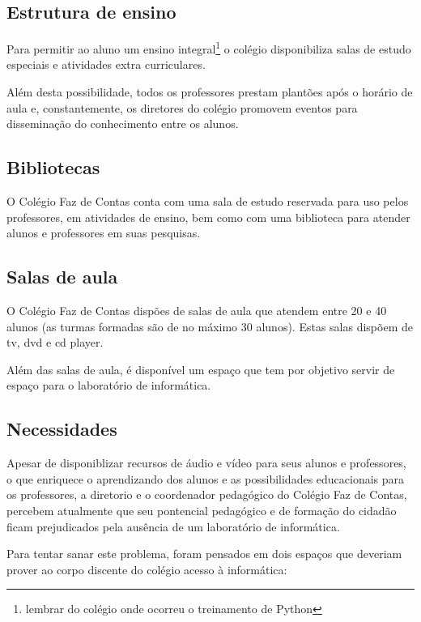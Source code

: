 \documentclass[a4paper,12pt]{report}
\begin{document}
            \subsection{Estrutura de ensino}
            Para permitir ao aluno um ensino integral\footnote{lembrar do
            colégio onde ocorreu o treinamento de Python} o colégio
            disponibiliza salas de estudo especiais e atividades extra
            curriculares.

            Além desta possibilidade, todos os professores prestam plantões
            após o horário de aula e, constantemente, os diretores do colégio
            promovem eventos para disseminação do conhecimento entre os
            alunos.

            \subsection{Bibliotecas}
            O Colégio Faz de Contas conta com uma sala de estudo reservada
            para uso pelos professores, em atividades de ensino, bem como com
            uma biblioteca para atender alunos e professores em suas pesquisas.

            \subsection{Salas de aula}
            O Colégio Faz de Contas dispões de salas de aula que atendem entre
            20 e 40 alunos (as turmas formadas são de no máximo 30 alunos).
            Estas salas dispõem de tv, dvd e cd player.

            Além das salas de aula, é disponível um espaço que tem por
            objetivo servir de espaço para o laboratório de informática.

            \subsection{Necessidades}
            Apesar de disponiblizar recursos de áudio e vídeo para seus alunos e
            professores, o que enriquece o aprendizando dos alunos e as
            possibilidades educacionais para os professores, a diretorio e o
            coordenador pedagógico do Colégio Faz de Contas, percebem atualmente
            que seu pontencial pedagógico e de formação do cidadão ficam
            prejudicados pela ausência de um laboratório de informática.

            Para tentar sanar este problema, foram pensados em dois espaços que
            deveriam prover ao corpo discente do colégio acesso à informática:
\end{document}
